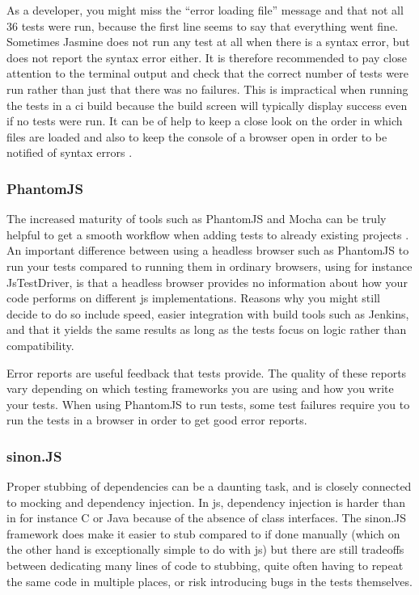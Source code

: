 \documentclass[11pt]{article}
\begin{document}
As a developer, you might miss the ``error loading file'' message and that not all 36 tests were run, because the first line seems to say that everything went fine. Sometimes Jasmine does not run any test at all when there is a syntax error, but does not report the syntax error either. It is therefore recommended to pay close attention to the terminal output and check that the correct number of tests were run rather than just that there was no failures. This is impractical when running the tests in a \gls{ci} build because the build screen will typically display success even if no tests were run. It can be of help to keep a close look on the order in which files are loaded and also to keep the console of a browser open in order to be notified of syntax errors \cite{MikeJansen}.

\subsubsection{PhantomJS}

The increased maturity of tools such as PhantomJS and Mocha can be truly helpful to get a smooth workflow when adding tests to already existing projects \cite[questions~11-12 and 20]{Edelstam}. An important difference between using a headless browser such as PhantomJS to run your tests compared to running them in ordinary browsers, using for instance JsTestDriver, is that a headless browser provides no information about how your code performs on different \gls{js} implementations. Reasons why you might still decide to do so include speed, easier integration with build tools such as Jenkins, and that it yields the same results as long as the tests focus on logic rather than compatibility. \cite[questions~13-15]{Edelstam}

Error reports are useful feedback that tests provide. The quality of these reports vary depending on which testing frameworks you are using and how you write your tests. When using PhantomJS to run tests, some test failures require you to run the tests in a browser in order to get good error reports. \cite[question~12]{Edelstam}

\subsubsection{sinon.JS}

Proper stubbing of dependencies can be a daunting task, and is closely connected to mocking and dependency injection. In \gls{js}, dependency injection is harder than in for instance C or Java because of the absence of class interfaces. The sinon.JS framework does make it easier to stub compared to if done manually (which on the other hand is exceptionally simple to do with \gls{js}) but there are still tradeoffs between dedicating many lines of code to stubbing, quite often having to repeat the same code in multiple places, or risk introducing bugs in the tests themselves.
\end{document}
